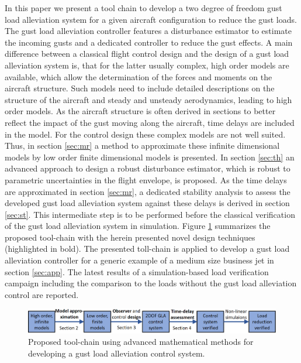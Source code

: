 \documentclass[graybox]{svmult}
\begin{document}
In this paper we present a tool chain to develop a two degree of freedom gust load alleviation system for a given aircraft configuration to reduce the gust loads. The gust load alleviation controller features a disturbance estimator to estimate the incoming gusts and a dedicated controller to reduce the gust effects. A main difference between a classical flight  control design and the design of a gust load alleviation system is, that for the latter usually complex, high order models are available, which allow the determination of the forces and moments on the  aircraft structure. Such models need to include detailed descriptions on the structure of the aircraft and steady and unsteady aerodynamics, leading to high order models. As the aircraft structure is often derived in sections to better reflect the impact of the gust moving along the aircraft, time delays are included in the model. For the control design these complex models are not well suited. Thus, in section \ref{sec:mr} a method to approximate  these infinite dimensional models by low order finite dimensional models is presented. In section \ref{sec:th} an advanced approach to design a robust disturbance estimator, which is robust to parametric uncertainties in the flight envelope, is proposed.
As the time delays are approximated in section \ref{sec:mr}, a dedicated stability analysis to assess the developed gust load alleviation system against these delays is derived in section \ref{sec:st}. This intermediate step is to be performed before the classical verification of the gust load alleviation system in simulation. Figure \ref{fig:toolchain} summarizes the proposed  tool-chain  with the  herein presented novel design techniques (highlighted in bold).  The presented toll-chain is applied to develop a gust load alleviation controller for a generic example of a medium size business jet in section \ref{sec:app}. The latest  results of a simulation-based load verification campaign including the comparison to  the loads  without  the gust load alleviation control are reported.

\begin{figure}[bth]
	\centering
		\includegraphics[width=1\textwidth]{strct.png}
	\caption{Proposed tool-chain using advanced mathematical methods for developing a gust load alleviation control system.}
	\label{fig:toolchain}	
\end{figure}
\end{document}
